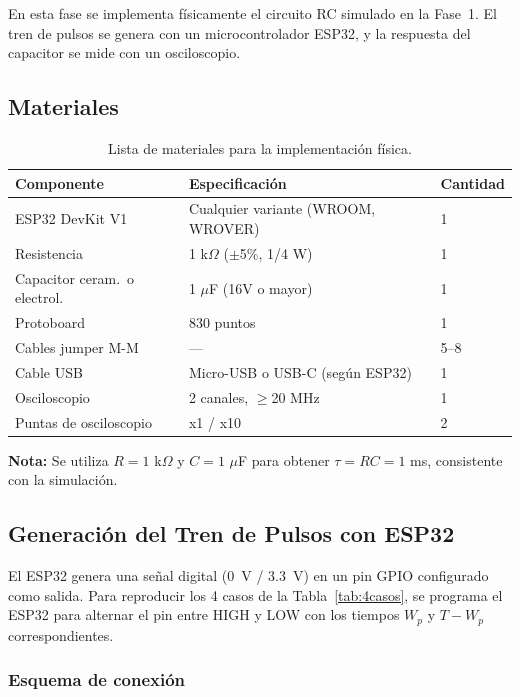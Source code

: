 \documentclass[12pt,a4paper]{article}
\begin{document}
En esta fase se implementa f\'isicamente el circuito RC simulado en la Fase~1. El tren de pulsos se genera con un microcontrolador ESP32, y la respuesta del capacitor se mide con un osciloscopio.

\subsection{Materiales}

\begin{table}[H]
    \centering
    \caption{Lista de materiales para la implementaci\'on f\'isica.}
    \begin{tabular}{lll}
        \toprule
        Componente & Especificaci\'on & Cantidad \\
        \midrule
        ESP32 DevKit V1 & Cualquier variante (WROOM, WROVER) & 1 \\
        Resistencia & 1 k$\Omega$ ($\pm$5\%, 1/4 W) & 1 \\
        Capacitor ceram.\ o electrol. & 1 $\mu$F (16V o mayor) & 1 \\
        Protoboard & 830 puntos & 1 \\
        Cables jumper M-M & --- & 5--8 \\
        Cable USB & Micro-USB o USB-C (seg\'un ESP32) & 1 \\
        Osciloscopio & 2 canales, $\geq$20 MHz & 1 \\
        Puntas de osciloscopio & x1 / x10 & 2 \\
        \bottomrule
    \end{tabular}
    \label{tab:materiales}
\end{table}

\textbf{Nota:} Se utiliza $R = 1$ k$\Omega$ y $C = 1$ $\mu$F para obtener $\tau = RC = 1$ ms, consistente con la simulaci\'on.

\subsection{Generaci\'on del Tren de Pulsos con ESP32}

El ESP32 genera una se\~nal digital (0~V / 3.3~V) en un pin GPIO configurado como salida. Para reproducir los 4 casos de la Tabla~\ref{tab:4casos}, se programa el ESP32 para alternar el pin entre HIGH y LOW con los tiempos $W_p$ y $T - W_p$ correspondientes.

\subsubsection{Esquema de conexi\'on}
\end{document}
